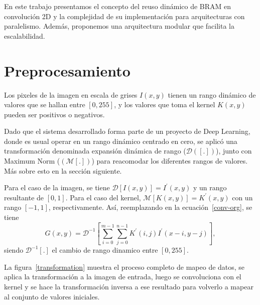 En este trabajo presentamos el concepto del reuso dinámico de BRAM en
convolución 2D y la complejidad de su implementación para arquitecturas con
paralelismo. Además, proponemos una arquitectura modular que facilita la
escalabilidad.

\section{Preprocesamiento}\label{dynamicrange}

Los pixeles de la imagen en escala de grises $I(x,y)$ tienen un rango dinámico
de valores que se hallan entre $[0,255]$, y los valores que toma el kernel
$K(x,y)$ pueden ser positivos o negativos.

Dado que el sistema desarrollado forma parte de un proyecto de Deep Learning,
donde es usual operar en un rango dinámico centrado en cero, se aplicó una
transformación denominada  expansión dinámica de rango\cite{dinamic_rango} ($\mathcal{D}([.])$),
junto con Maximum Norm\cite{max_norm} ($(\mathcal{M}[.])$) para reacomodar los diferentes 
rangos de valores. Más sobre esto en la sección siguiente.

Para el caso de la imagen, se tiene $\mathcal{D}[I(x,y)]=I^\prime(x,y)$ y un
rango resultante de $[0,1]$. Para el caso del kernel,
$\mathcal{M}[K(x,y)]=K^\prime(x,y)$ con un rango $[-1,1]$, respectivamente.
Así, reemplazando en la ecuación~\ref{conv-org}, se tiene 
\begin{equation}\label{conv-org1}
  G(x,y) = \mathcal{D}^{-1}\left[\sum_{i=0}^{m-1} \sum_{j=0}^{n-1}K^\prime(i,j)I^\prime(x-i,y-j)\right],
\end{equation}
siendo $\mathcal{D}^{-1}[.]$ el cambio de rango dinamico entre $[0,255]$.

La figura~\ref{transformation} muestra el proceso completo de mapeo de datos, se
aplica la transformación a la imagen de entrada, luego se convoluciona con el
kernel y se hace la transformación inversa a ese resultado para volverlo a
mapear al conjunto de valores iniciales.

